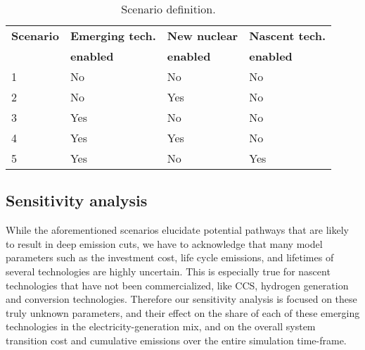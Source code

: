 \begin{table}[!ht]
	\caption{Scenario definition.}
	\vspace{0.1in}
	\begin{tabularx}{\textwidth}{p{} p{} p{} p{}}
\hline 
\textbf{Scenario}& \textbf{Emerging tech.} & \textbf{New nuclear} & \textbf{Nascent tech.}\\
                 & \textbf{enabled} & \textbf{enabled} & \textbf{enabled}\\
                  \hline
1               &  No       &         No     &     No  \\ 
2               &   No       &      Yes     &     No  \\ 
3               &   Yes     &         No      &     No   \\
4               &   Yes     &      Yes     &     No  \\ 
5               &   Yes     &      No     &     Yes  \\ 
\hline
	\end{tabularx}
\label{scen-table}
\end{table}



\subsection{Sensitivity analysis}
While the aforementioned scenarios elucidate potential pathways that are likely to result in deep emission cuts, we have to acknowledge that many model parameters such as the investment cost, life cycle emissions, and lifetimes of several technologies are highly uncertain. This is especially true for nascent technologies that have not been commercialized, like \gls{CCS}, hydrogen generation and conversion technologies. Therefore our sensitivity analysis is focused on these truly unknown parameters, and their effect on the share of each of these emerging technologies in the electricity-generation mix, and on the overall system transition cost and cumulative emissions over the entire simulation time-frame. 

